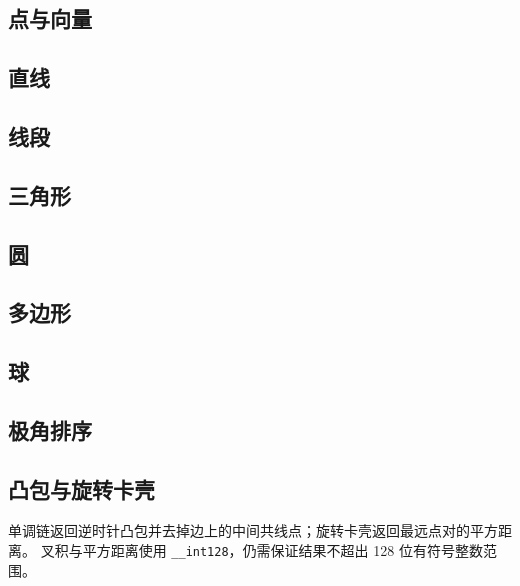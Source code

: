 \documentclass[11pt,a4paper,twocolumn]{ctexart}  %
\begin{document}
\subsection{点与向量}



\subsection{直线}

\subsection{线段}

\subsection{三角形}

\subsection{圆}

\subsection{多边形}

\subsection{球}

\subsection{极角排序}

\subsection{凸包与旋转卡壳}
单调链返回逆时针凸包并去掉边上的中间共线点；旋转卡壳返回最远点对的平方距离。
叉积与平方距离使用 \texttt{\_\_int128}，仍需保证结果不超出 128 位有符号整数范围。

\clearpage
\end{document}
